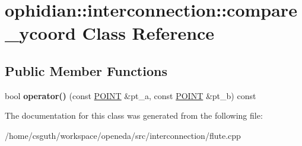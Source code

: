 \hypertarget{classophidian_1_1interconnection_1_1compare__ycoord}{\section{ophidian\-:\-:interconnection\-:\-:compare\-\_\-ycoord Class Reference}
\label{classophidian_1_1interconnection_1_1compare__ycoord}
}
\subsection*{Public Member Functions}
\begin{DoxyCompactItemize}
\item 
\hypertarget{classophidian_1_1interconnection_1_1compare__ycoord_a061fd2854fb580dde7b3160083479ece}{bool {\bfseries operator()} (const \hyperlink{structophidian_1_1interconnection_1_1point}{P\-O\-I\-N\-T} \&pt\-\_\-a, const \hyperlink{structophidian_1_1interconnection_1_1point}{P\-O\-I\-N\-T} \&pt\-\_\-b) const }\label{classophidian_1_1interconnection_1_1compare__ycoord_a061fd2854fb580dde7b3160083479ece}

\end{DoxyCompactItemize}


The documentation for this class was generated from the following file\-:\begin{DoxyCompactItemize}
\item 
/home/csguth/workspace/openeda/src/interconnection/flute.\-cpp\end{DoxyCompactItemize}
